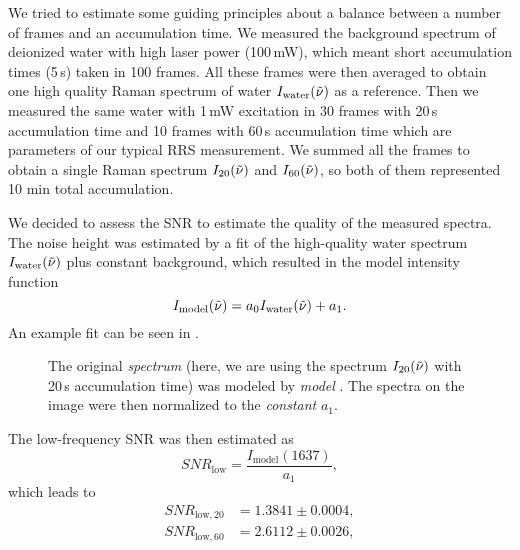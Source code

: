 We tried to estimate some guiding principles about a balance between a number
of frames and an accumulation time.
We measured the background spectrum of deionized water with high laser power
(100\,mW), which meant short accumulation times (5\,s) taken in 100 frames.
All these frames were then averaged to obtain one high quality Raman spectrum
of water $I_\text{water}(\tilde{\nu})$ as a reference.
Then we measured the same water with 1\,mW excitation in 30 frames with 20\,s
accumulation time and 10 frames with 60\,s accumulation time which are
parameters of our typical RRS measurement. We summed all the frames to obtain a
single Raman spectrum $I_{20}(\tilde{\nu})$ and $I_{60}(\tilde{\nu})$, so both of them
represented 10 min total accumulation.

We decided to assess the SNR to estimate the quality of the measured spectra.
The noise height was estimated by a fit of the high-quality water spectrum
$I_\text{water}(\tilde{\nu})$ plus constant background, which resulted in the model
intensity function
\begin{equation}
	I_\text{model}(\wn) = a_0 I_\text{water}(\wn) + a_1.
	\label{\eqnlabel{accum_length:sn_model}}
\end{equation}
An example fit can be seen in
.

\begin{figure}
	\centering
	
	\caption[%
		Signal-to-noise ratio calculation from a fit of the high-quality spectrum
		and constant background addition.%
	]{%
		The original \emph{spectrum} (here, we are using the spectrum $I_{20}(\tilde{\nu})$
		with 20\,s accumulation time) was modeled by \emph{model}
		.
		The spectra on the image were then normalized to the \emph{constant} $a_1$.
	}
	\label{\figlabel{accum_length:sn_ratio}}
\end{figure}

The low-frequency SNR was then estimated as
\begin{equation*}
	SNR_\text{low} = \frac{I_\text{model}(1637)}{a_1},
\end{equation*}
which leads to
\begin{align*}
	SNR_{\text{low},20} &= 1.3841 \pm 0.0004, \\
	SNR_{\text{low},60} &= 2.6112 \pm 0.0026,
\end{align*}

